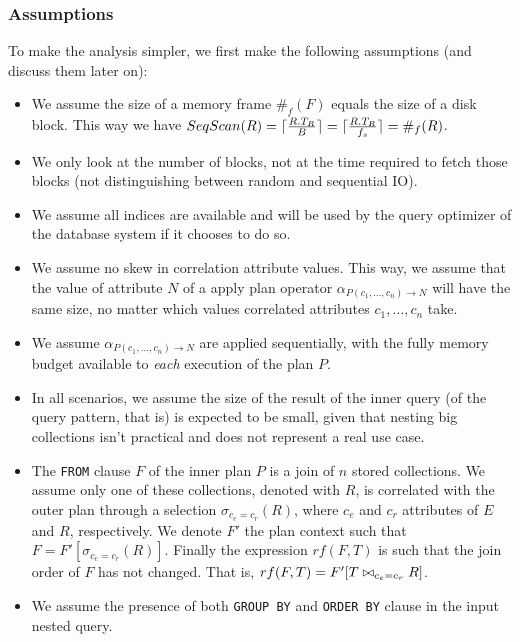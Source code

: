 \subsubsection{Assumptions}

To make the analysis simpler, we first make the following assumptions (and discuss them later on):

\begin{itemize}
\item We assume the size of a memory frame $\#_f(F)$ equals the size of a disk block.  This way we have $SeqScan(R) = \lceil\frac{R.T_R}{B}\rceil = \lceil\frac{R.T_R}{f_s}\rceil = \#_f(R)$.
\item We only look at the number of blocks, not at the time required to fetch those blocks (not distinguishing between random and sequential IO). 
\item We assume all indices are available and will be used by the query optimizer of the database system if it chooses to do so.
\item We assume no skew in correlation attribute values. This way, we assume that the value of attribute $N$ of a apply plan operator $\alpha_{P(c_1,\dots,c_n) \rightarrow N}$ will have the same size, no matter which values correlated attributes $c_1,\dots,c_n$ take.
\item We assume $\alpha_{P(c_1,\dots,c_n) \rightarrow N}$ are applied sequentially, with the fully memory budget available to \emph{each} execution of the plan $P$.
\item In all scenarios, we assume the size of the result of the inner query (of the query pattern, that is) is expected to be small, given that nesting big collections isn't practical and does not represent a real use case.
\item The \texttt{FROM} clause $F$ of the inner plan $P$ is a join of $n$ stored collections. We assume only one of these collections, denoted with $R$, is correlated with the outer plan through a selection $\sigma_{c_e = c_r}(R)$, where $c_e$ and $c_r$ attributes of $E$ and $R$, respectively. We denote $F'$ the plan context such that $F = F'[\sigma_{c_e = c_r}(R)]$. Finally the expression $rf(F,T)$ is such that the join order of $F$ has not changed. That is, $rf(F,T) = F'[T \bowtie_{c_e = c_r} R]$.
\item We assume the presence of both \texttt{GROUP BY} and \texttt{ORDER BY} clause in the input nested query. 

\end{itemize}

